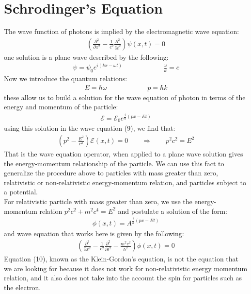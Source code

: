 \documentclass[11pt]{article}
\theoremstyle{break}
\theoremstyle{break}
\begin{document}
\section{Schrodinger's Equation}
The wave function of photons is implied by the electromagnetic wave equation:
\begin{align}
\left( \frac{\partial^2}{\partial x^2} - \frac{1}{c^2}\frac{\partial^2}{\partial t^2}\right) \psi(x,t) = 0
\end{align}
one solution is a plane wave described by the following:
\begin{align*}
\psi = \psi_0 e^{i(kx - \omega t)} \qquad\qquad \qquad \frac{\omega}{k} = c
\end{align*}
Now we introduce the quantum relations:
\begin{align*}
E = \hbar \omega \qquad\qquad\qquad p=\hbar k
\end{align*}
these allow us to build a solution for the wave equation of photon in terms of the energy and momentum of the particle:
\begin{align*}
\mathcal{E} = \mathcal{E}_0 e^{\frac{i}{\hbar}(px-Et)}
\end{align*}
using this solution in the wave equation (9), we find that:
\begin{align*}
\left( p^2 - \frac{E^2}{c^2}\right) \mathcal{E}(x,t)  =0 \qquad\Rightarrow \qquad p^2c^2 = E^2
\end{align*}
That is the wave equation operator, when applied to a plane wave solution gives the energy-momentum relationship of the particle. We can use this fact to generalize the procedure above to particles with mass greater than zero, relativistic or non-relativistic energy-momentum relation, and particles subject to a potential.
\\

For relativistic particle with mass greater than zero, we use the energy-momentum relation $p^2c^2 + m^2c^4 = E^2$ and postulate a solution of the form:
\begin{align*}
\phi(x,t)= A^{\frac{i}{\hbar}(px-Et)} 
\end{align*}
and wave equation that works here is given by the following:
\begin{align}
\left( \frac{\partial^2}{\partial x^2} - \frac{1}{c^2}\frac{\partial^2}{\partial t^2} - \frac{m^2 c^2}{\hbar^2}\right) \phi(x,t) = 0
\end{align}
Equation (10), known as the Klein-Gordon's equation, is not the equation that we are looking for because it does not work for non-relativistic energy momentum relation, and it also does not take into the account the spin for particles such as the electron.\\
\end{document}
